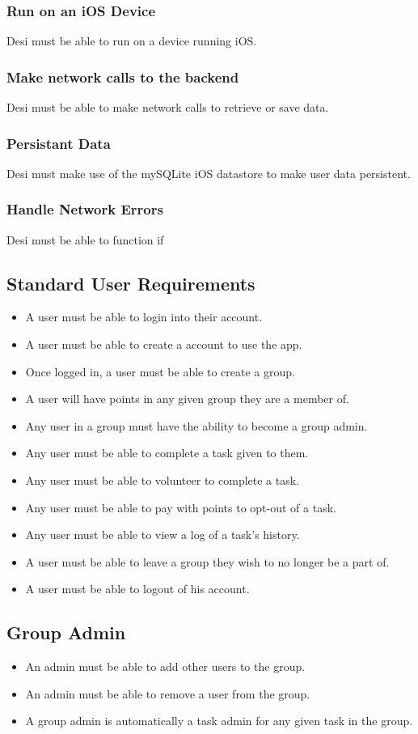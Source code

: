 \documentclass[11pt, a4paper]{report}
\begin{document}
\subsubsection{Run on an iOS Device}
Desi must be able to run on a device running iOS.
\subsubsection{Make network calls to the backend}
Desi must be able to make network calls to retrieve or save data.
\subsubsection{Persistant Data}
Desi must make use of the mySQLite iOS datastore to make user data persistent.
\subsubsection{Handle Network Errors}
Desi must be able to function if 

\subsection{Standard User Requirements}
\begin{itemize} 
\item A user must be able to login into their account.
\item A user must be able to create a account to use the app.
\item Once logged in, a user must be able to create a group.
\item A user will have points in any given group they are a member of.
\item Any user in a group must have the ability to become a group admin.
\item Any user must be able to complete a task given to them.
\item Any user must be able to volunteer to complete a task.
\item Any user must be able to pay with points to opt-out of a task.
\item Any user must be able to view a log of a task's history.
\item A user must be able to leave a group they wish to no longer be a part of.
\item A user must be able to logout of his account.
 \end{itemize}


\subsection{Group Admin}
\begin{itemize}
\item An admin must be able to add other users to the group.
\item An admin must be able to remove a user from the group.
\item A group admin is automatically a task admin for any given task in the group.
\end{itemize}
\end{document}
